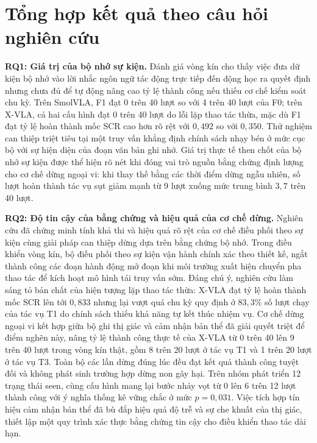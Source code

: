 \section{Tổng hợp kết quả theo câu hỏi nghiên cứu}
\label{sec:ch4-rq-summary}

\textbf{RQ1: Giá trị của bộ nhớ sự kiện.} Đánh giá vòng kín cho thấy việc đưa dữ kiện bộ nhớ vào lời nhắc ngôn ngữ tác động trực tiếp đến động học ra quyết định nhưng chưa đủ để tự động nâng cao tỷ lệ thành công nếu thiếu cơ chế kiểm soát chu kỳ. Trên SmolVLA, F1 đạt 0 trên 40 lượt so với 4 trên 40 lượt của F0; trên X-VLA, cả hai cấu hình đạt 0 trên 40 lượt do lỗi lặp thao tác thừa, mặc dù F1 đạt tỷ lệ hoàn thành mốc SCR cao hơn rõ rệt với $0{,}492$ so với $0{,}350$. Thử nghiệm can thiệp triệt tiêu tại một truy vấn khẳng định chính sách nhạy bén ở mức cục bộ với sự hiện diện của đoạn văn bản ghi nhớ. Giá trị thực tế then chốt của bộ nhớ sự kiện được thể hiện rõ nét khi đóng vai trò nguồn bằng chứng định lượng cho cơ chế dừng ngoại vi: khi thay thế bằng các thời điểm dừng ngẫu nhiên, số lượt hoàn thành tác vụ sụt giảm mạnh từ 9 lượt xuống mức trung bình $3{,}7$ trên 40 lượt.

\textbf{RQ2: Độ tin cậy của bằng chứng và hiệu quả của cơ chế dừng.} Nghiên cứu đã chứng minh tính khả thi và hiệu quả rõ rệt của cơ chế điều phối theo sự kiện cùng giải pháp can thiệp dừng dựa trên bằng chứng bộ nhớ. Trong điều khiển vòng kín, bộ điều phối theo sự kiện vận hành chính xác theo thiết kế, ngắt thành công các đoạn hành động mở đoạn khi môi trường xuất hiện chuyển pha thao tác để kích hoạt mô hình tái truy vấn sớm. Đáng chú ý, nghiên cứu làm sáng tỏ bản chất của hiện tượng lặp thao tác thừa: X-VLA đạt tỷ lệ hoàn thành mốc SCR lên tới $0{,}833$ nhưng lại vượt quá chu kỳ quy định ở $83{,}3$\% số lượt chạy của tác vụ T1 do chính sách thiếu khả năng tự kết thúc nhiệm vụ. Cơ chế dừng ngoại vi kết hợp giữa bộ ghi thị giác và cảm nhận bản thể đã giải quyết triệt để điểm nghẽn này, nâng tỷ lệ thành công thực tế của X-VLA từ 0 trên 40 lên 9 trên 40 lượt trong vòng kín thật, gồm 8 trên 20 lượt ở tác vụ T1 và 1 trên 20 lượt ở tác vụ T3. Toàn bộ các lần dừng đúng lúc đều đạt kết quả thành công tuyệt đối và không phát sinh trường hợp dừng non gây hại. Trên nhóm phát triển 12 trạng thái seen, cùng cấu hình mang lại bước nhảy vọt từ 0 lên 6 trên 12 lượt thành công với ý nghĩa thống kê vững chắc ở mức $p = 0{,}031$. Việc tích hợp tín hiệu cảm nhận bản thể đã bù đắp hiệu quả độ trễ và sự che khuất của thị giác, thiết lập một quy trình xác thực bằng chứng tin cậy cho điều khiển thao tác dài hạn.

